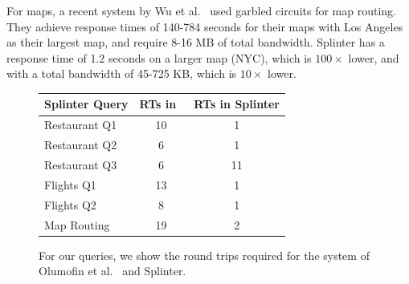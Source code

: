 For maps, a recent system by Wu et al.~\cite{wu2016} used
garbled circuits for map routing. They achieve response times
of 140-784 seconds for their maps with Los Angeles as their largest map,
and require 8-16 MB of total bandwidth. Splinter has a response time of 1.2
seconds on a larger map (NYC), which is $100\times$ lower, and with
a total bandwidth of 45-725 KB, which is $10\times$ lower.


\begin{figure}
	\centering
		\begin{tabular}{lcc}
			\toprule
			\bf Splinter Query & \bf RTs in~\cite{goldberg} & \bf RTs in Splinter \\
			\midrule
			Restaurant Q1 & 10 & 1 \\
			\midrule
			Restaurant Q2 & 6 & 1 \\ 
			\midrule
			Restaurant Q3 & 6 & 11 \\
			\midrule
			Flights Q1 & 13 & 1 \\
			\midrule
			Flights Q2 & 8 & 1 \\
			\midrule
			Map Routing & 19 & 2 \\
			\bottomrule
		\end{tabular}
	\caption{For our queries, we show the round trips required for the system of Olumofin et al.~\cite{goldberg} and Splinter.\protect\footnotemark}
	\label{fig:rt-comparison}
\end{figure}

